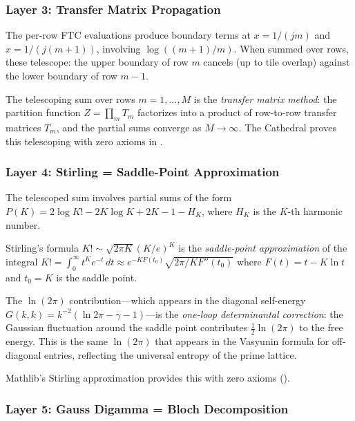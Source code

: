 \documentclass[11pt,a4paper]{article}
\begin{document}
\subsubsection{Layer 3: Transfer Matrix Propagation}

The per-row FTC evaluations produce boundary terms at $x = 1/(jm)$
and $x = 1/(j(m+1))$, involving $\log((m+1)/m)$. When summed over
rows, these telescope: the upper boundary of row $m$ cancels (up to
tile overlap) against the lower boundary of row $m-1$.

\begin{principle}
The telescoping sum over rows $m = 1, \ldots, M$ is the
\emph{transfer matrix method}: the partition function
$Z = \prod_{m} T_m$ factorizes into a product of row-to-row
transfer matrices $T_m$, and the partial sums
converge as $M \to \infty$. The Cathedral proves this telescoping
with zero axioms in .
\end{principle}

\subsubsection{Layer 4: Stirling = Saddle-Point Approximation}

The telescoped sum involves partial sums of the form
$P(K) = 2\log K! - 2K\log K + 2K - 1 - H_K$, where $H_K$ is
the $K$-th harmonic number.

\begin{correspondence}
Stirling's formula $K! \sim \sqrt{2\pi K}(K/e)^K$ is the
\emph{saddle-point approximation} of the integral
$K! = \int_0^\infty t^K e^{-t}\,dt \approx e^{-KF(t_0)}\sqrt{2\pi/KF''(t_0)}$
where $F(t) = t - K\ln t$ and $t_0 = K$ is the saddle point.

The $\ln(2\pi)$ contribution---which appears in the diagonal self-energy
$G(k,k) = k^{-2}(\ln 2\pi - \gamma - 1)$---is the \emph{one-loop
determinantal correction}: the Gaussian fluctuation around the saddle
point contributes $\tfrac{1}{2}\ln(2\pi)$ to the free energy.
This is the same $\ln(2\pi)$ that appears in the Vasyunin formula
for off-diagonal entries, reflecting the universal entropy of the
prime lattice.

Mathlib's Stirling approximation provides this with zero axioms
().
\end{correspondence}

\subsubsection{Layer 5: Gauss Digamma = Bloch Decomposition}
\end{document}
